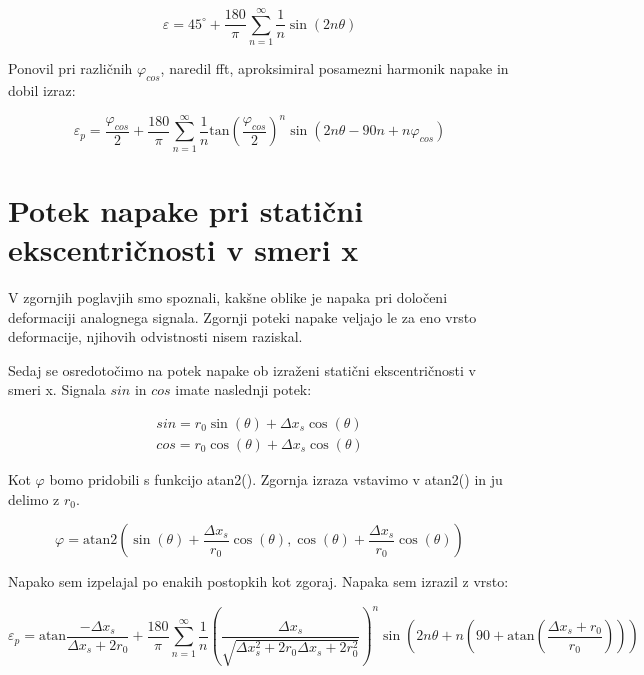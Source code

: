 \begin{equation}
\varepsilon = 45^\circ + \frac{180}{\pi}\sum_{n=1}^{\infty}\frac{1}{n} \sin (2n \theta)
\end{equation}


Ponovil pri različnih $\varphi_{cos}$, naredil fft, aproksimiral posamezni harmonik napake in dobil izraz:


\begin{equation}
\label{vrsta_faza_sin}
\varepsilon_p = \frac{\varphi_{cos}}{2} + \frac{180}{\pi}\sum_{n=1}^{\infty}\frac{1}{n} \mathrm{tan}(\frac{\varphi_{cos}}{2})^n \sin (2n \theta- 90 n+n \varphi_{cos})
\end{equation}




\newpage
\section{Potek napake pri statični ekscentričnosti v smeri x}

V zgornjih poglavjih smo spoznali, kakšne oblike je napaka pri določeni deformaciji analognega signala.
Zgornji poteki napake veljajo le za eno vrsto deformacije, njihovih odvistnosti nisem raziskal.

Sedaj se osredotočimo na potek napake ob izraženi statični ekscentričnosti v smeri x. Signala $sin$ in $cos$ imate naslednji potek:

\begin{eqnarray}
\label{xs_analit}
sin = r_0 \sin(\theta) + \Delta x_s \cos(\theta) \\
cos = r_0 \cos(\theta) + \Delta x_s \cos(\theta)
\end{eqnarray}

Kot $\varphi$ bomo pridobili s funkcijo atan2(). Zgornja izraza vstavimo v atan2() in ju delimo z $r_0$.
 
 \begin{equation}
 \varphi = \mathrm{atan2}(\sin(\theta) + \frac{\Delta x_s}{r_0} \cos(\theta),\cos(\theta) + \frac{\Delta x_s}{r_0} \cos(\theta))
 \end{equation}
 
 Napako sem izpelajal po enakih postopkih kot zgoraj.
 Napaka sem izrazil z vrsto:
 
 \begin{equation}
 \label{vrsta:xs}
 \varepsilon_p = \mathrm{atan}\frac{-\Delta x _s}{\Delta x _s+2r_0}+\frac{180}{\pi} \sum_{n=1}^{\infty}\frac{1}{n} (\frac{\Delta x _s}{\sqrt{\Delta x _s^2+2 r_0 \Delta x _s+2r_0^2}})^n \sin (2n \theta+n (90+ \mathrm{ atan}(\frac{\Delta x _s+r_0}{r_0})))
 \end{equation}
 
